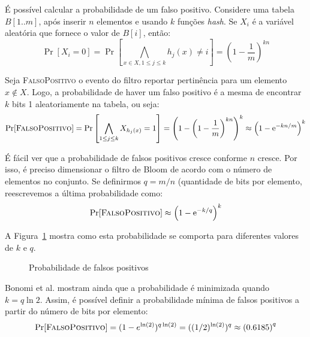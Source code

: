 É possível calcular a probabilidade de um falso positivo. Considere uma tabela $B[1..m]$, após inserir $n$ elementos e usando $k$ funções \emph{hash}. Se $X_i$ é a variável aleatória que fornece o valor de $B[i]$, então:
\[
\Pr[X_i = 0] = \Pr\left[\bigwedge_{x \in X, 1 \leq j \leq k} h_j(x) \neq i \right] = \left( 1 - \frac{1}{m}\right)^{kn}
\]

Seja \textsc{FalsoPositivo} o evento do filtro reportar pertinência para um elemento $x \notin X$. Logo, a probabilidade de haver um falso positivo é a mesma de encontrar $k$ bits 1 aleatoriamente na tabela, ou seja:
\[
\Pr[\textsc{FalsoPositivo}] = \Pr\left[\bigwedge_{1 \leq j \leq k} X_{h_j(x)} = 1 \right] = \left( 1 - \left( 1 - \frac{1}{m}\right)^{kn} \right)^k \approx \left( 1 - \mathrm{e} ^{-kn/m} \right)^k
\]

É fácil ver que a probabilidade de falsos positivos cresce conforme $n$ cresce. Por isso, é preciso dimensionar o filtro de Bloom de acordo com o número de elementos no conjunto. Se definirmos $q = m/n$ (quantidade de bits por elemento, reescrevemos a última probabilidade como:
\[
\Pr[\textsc{FalsoPositivo}] \approx \left( 1 - \mathrm{e} ^{-k/q} \right)^k
\]

A Figura~\ref{fig:probfalso1} mostra como esta probabilidade se comporta para diferentes valores de $k$ e $q$.

\begin{figure}[!htbp]
\centering
{}
\caption{Probabilidade de falsos positivos}
\label{fig:probfalso1}
\end{figure}

Bonomi et al. \cite{bonomi2006improved} mostram ainda que a probabilidade é minimizada quando $k = q \ln 2$. Assim, é possível definir a probabilidade mínima de falsos positivos a partir do número de bits por elemento:
\[
\Pr[\textsc{FalsoPositivo}] = (1-e^{\ln(2)}) ^ {q \ln(2)} = ((1/2)^{\ln(2)})^q \approx \left( 0.6185 \right)^q
\]

